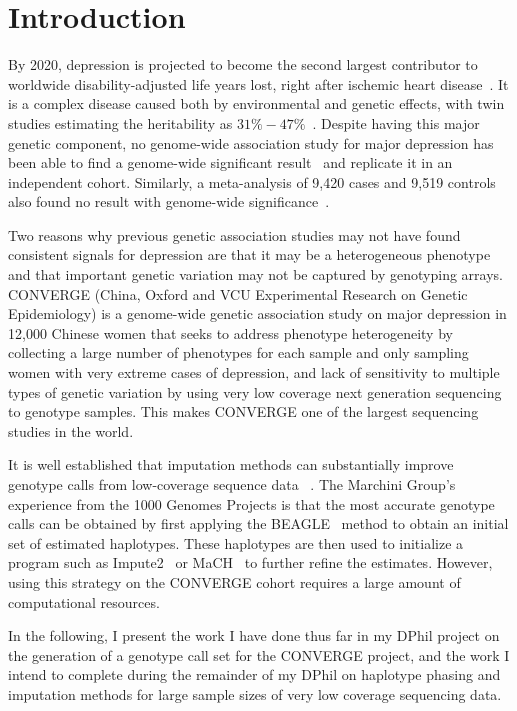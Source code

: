 \documentclass[a4paper]{article}
\begin{document}
\section*{Introduction}

By 2020, depression is projected to become the second largest
contributor to worldwide disability-adjusted life years
lost, right after ischemic heart disease~\autocite{Murray1996}. It is a
complex disease caused both by environmental and genetic effects, with
twin studies estimating the heritability as
$31\%-47\%$~\autocite{Sullivan2000}.  Despite having this
major genetic component, no genome-wide association study for major
depression has been able to find a genome-wide significant
result~\autocite{Kohli2011,Rietschel2010,Wray2012,Muglia2010,Lewis2010,Sullivan2009,Boomsma2008,Shyn2011}
and replicate it in an independent cohort.
Similarly, a meta-analysis of 9,420 cases and 9,519 controls also
found no result with genome-wide significance~\autocite{Ripke2013}.

Two reasons why previous genetic
association studies may not have found consistent signals for depression
are that it may be a heterogeneous phenotype and that
important genetic variation may not be captured by genotyping arrays.
CONVERGE (China, Oxford and VCU Experimental Research on Genetic
Epidemiology) is a genome-wide genetic association study on major
depression in 12,000 Chinese women that seeks to address phenotype
heterogeneity by collecting a large number of phenotypes for each
sample and only sampling women with very extreme cases of depression,
and lack of sensitivity to multiple types of genetic variation 
by using very low coverage next generation sequencing to genotype
samples. This makes CONVERGE one of the largest sequencing studies in
the world.

It is well established that imputation methods can substantially
improve genotype calls from low-coverage sequence data
~\autocite{Project2012, Li2010, Wang2013}.
The Marchini Group's experience from the 1000 Genomes Projects is that
the most accurate genotype calls can be obtained by first applying the BEAGLE~\autocite{Browning2009}
method to obtain an initial set of estimated haplotypes. These
haplotypes are then used to initialize a program such as
Impute2~\autocite{Howie2009} or MaCH~\autocite{Li2010} to further refine the
estimates.
However, using this strategy on the CONVERGE cohort requires a large
amount of computational resources.

In the following, I present the work I have done thus far in my DPhil project on
the generation of a genotype call set for the CONVERGE project, and
the work I intend to complete during the remainder of my DPhil on
haplotype phasing and imputation methods for large sample sizes of
very low coverage sequencing data.
\end{document}
